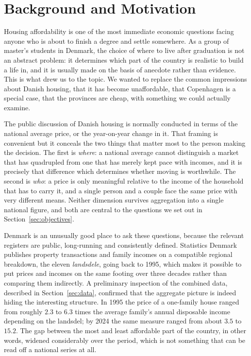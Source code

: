 \section{Background and Motivation}
\label{sec:background}

Housing affordability is one of the most immediate economic questions facing
anyone who is about to finish a degree and settle somewhere. As a group of
master's students in Denmark, the choice of where to live after graduation is
not an abstract problem: it determines which part of the country is realistic
to build a life in, and it is usually made on the basis of anecdote rather than
evidence. This is what drew us to the topic. We wanted to replace the common
impressions about Danish housing, that it has become unaffordable, that
Copenhagen is a special case, that the provinces are cheap, with something we
could actually examine.

The public discussion of Danish housing is normally conducted in terms of the
national average price, or the year-on-year change in it. That framing is
convenient but it conceals the two things that matter most to the person making
the decision. The first is \emph{where}: a national average cannot distinguish a
market that has quadrupled from one that has merely kept pace with incomes, and
it is precisely that difference which determines whether moving is worthwhile.
The second is \emph{who}: a price is only meaningful relative to the income of
the household that has to carry it, and a single person and a couple face the
same price with very different means. Neither dimension survives aggregation
into a single national figure, and both are central to the questions we set out
in Section~\ref{sec:objectives}.

Denmark is an unusually good place to ask these questions, because the relevant
registers are public, long-running and consistently defined. Statistics Denmark
publishes property transactions and family incomes on a compatible regional
breakdown, the eleven \emph{landsdele}, going back to 1995, which makes it
possible to put prices and incomes on the same footing over three decades rather
than comparing them indirectly. A preliminary inspection of the combined data,
described in Section~\ref{sec:data}, confirmed that the aggregate picture is
indeed hiding the interesting structure. In 1995 the price of a one-family house
ranged from roughly $2.3$ to $6.3$ times the average family's annual disposable
income depending on the landsdel; by 2024 the same measure ranged from about
$3.5$ to $15.2$. The gap between the most and least affordable part of the
country, in other words, widened considerably over the period, which is not
something that can be read off a national series at all.

